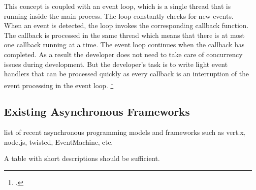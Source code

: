 

This concept is coupled with an event loop, which is a single thread that is
running inside the main process.
The loop constantly checks for new events. When an event is detected, the loop
invokes the corresponding callback function. The callback is processed in the
same thread which means that there is at most one callback running at a time.
The event loop continues when the callback has completed. As a result the
developer does not need to take care of concurrency issues during development.
But the developer's task is to write light event handlers that can be processed
quickly as every callback is an interruption of the event processing in the
event loop. \footcite[Cf.][]{Croucher_2010}




\subsection{Existing Asynchronous Frameworks}
\label{existing_frameworks}
list of recent asynchronous programming models and frameworks such as vert.x,
node.js, twisted, EventMachine, etc.

A table with short descriptions should be sufficient.

